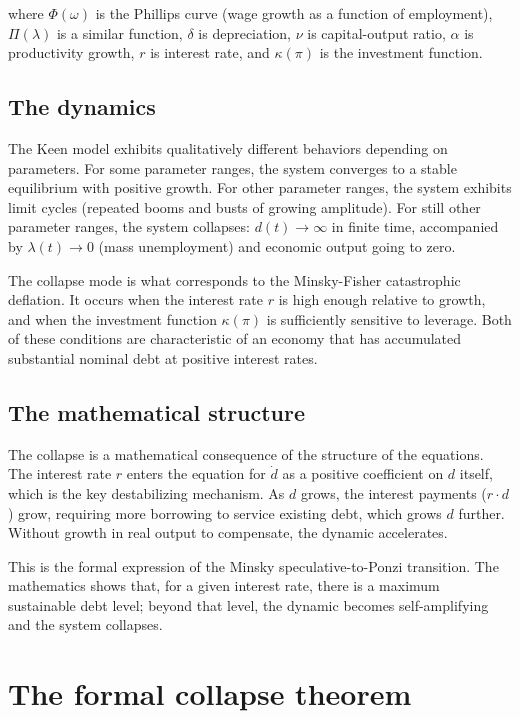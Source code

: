where $\Phi(\omega)$ is the Phillips curve (wage growth as a function
of employment), $\Pi(\lambda)$ is a similar function, $\delta$ is
depreciation, $\nu$ is capital-output ratio, $\alpha$ is
productivity growth, $r$ is interest rate, and $\kappa(\pi)$ is
the investment function.

\subsection{The dynamics}

The Keen model exhibits qualitatively different behaviors
depending on parameters. For some parameter ranges, the system
converges to a stable equilibrium with positive growth.
For other parameter ranges, the system exhibits limit cycles
(repeated booms and busts of growing amplitude). For still other
parameter ranges, the system collapses: $d(t) \to \infty$ in
finite time, accompanied by $\lambda(t) \to 0$ (mass unemployment)
and economic output going to zero.

The collapse mode is what corresponds to the Minsky-Fisher
catastrophic deflation. It occurs when the interest rate $r$ is
high enough relative to growth, and when the investment function
$\kappa(\pi)$ is sufficiently sensitive to leverage. Both of these
conditions are characteristic of an economy that has accumulated
substantial nominal debt at positive interest rates.

\subsection{The mathematical structure}

The collapse is a mathematical consequence of the structure of the
equations. The interest rate $r$ enters the equation for $\dot{d}$
as a positive coefficient on $d$ itself, which is the key
destabilizing mechanism. As $d$ grows, the interest payments
($r \cdot d$) grow, requiring more borrowing to service existing
debt, which grows $d$ further. Without growth in real output to
compensate, the dynamic accelerates.

This is the formal expression of the Minsky speculative-to-Ponzi
transition. The mathematics shows that, for a given interest rate,
there is a maximum sustainable debt level; beyond that level, the
dynamic becomes self-amplifying and the system collapses.

\section{The formal collapse theorem}
\label{sec:riba-formal}

